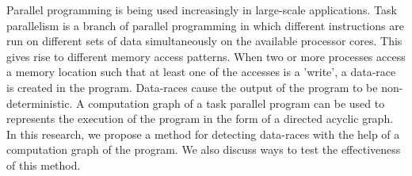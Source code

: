Parallel programming is being used increasingly in large-scale applications. Task parallelism is a branch of parallel programming in which different instructions are run on different sets of data simultaneously on the available processor cores. This gives rise to different memory access patterns. When two or more processes access a memory location such that at least one of the accesses is a  'write', a data-race is created in the program. Data-races cause the output of the program to be non-deterministic. A computation graph of a task parallel program can be used to represents the execution of the program in the form of a directed acyclic graph. In this research, we propose a method for detecting data-races with the help of a computation graph of the program. We also discuss ways to test the effectiveness of this method.
